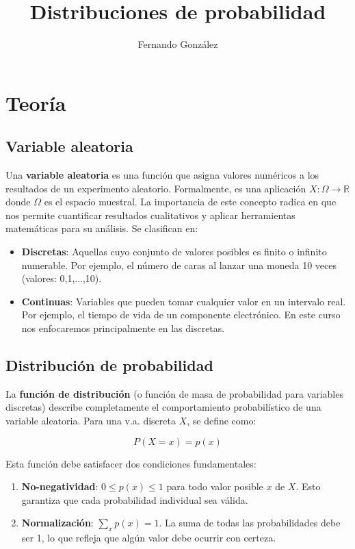 \documentclass[letterpaper, 12pt]{article}
\title{Distribuciones de probabilidad}
\author{Fernando González}
\begin{document}
	
	\maketitle
	
	\section{Teoría}
	
	\subsection{Variable aleatoria}
	Una \textbf{variable aleatoria} es una función que asigna valores numéricos a los resultados de un experimento aleatorio. Formalmente, es una aplicación $X: \Omega \to \mathbb{R}$ donde $\Omega$ es el espacio muestral. La importancia de este concepto radica en que nos permite cuantificar resultados cualitativos y aplicar herramientas matemáticas para su análisis. Se clasifican en:
	
	\begin{itemize}
		\item \textbf{Discretas}: Aquellas cuyo conjunto de valores posibles es finito o infinito numerable. Por ejemplo, el número de caras al lanzar una moneda 10 veces (valores: 0,1,...,10).
		
		\item \textbf{Continuas}: Variables que pueden tomar cualquier valor en un intervalo real. Por ejemplo, el tiempo de vida de un componente electrónico. En este curso nos enfocaremos principalmente en las discretas.
	\end{itemize}
	
	\subsection{Distribución de probabilidad}
	La \textbf{función de distribución} (o función de masa de probabilidad para variables discretas) describe completamente el comportamiento probabilístico de una variable aleatoria. Para una v.a. discreta $X$, se define como:
	
	\[ P(X = x) = p(x) \]
	
	Esta función debe satisfacer dos condiciones fundamentales:
	\begin{enumerate}
		\item \textbf{No-negatividad}: $0 \leq p(x) \leq 1$ para todo valor posible $x$ de $X$. Esto garantiza que cada probabilidad individual sea válida.
		
		\item \textbf{Normalización}: $\sum_x p(x) = 1$. La suma de todas las probabilidades debe ser 1, lo que refleja que algún valor debe ocurrir con certeza.
	\end{enumerate}
	
\end{document}
